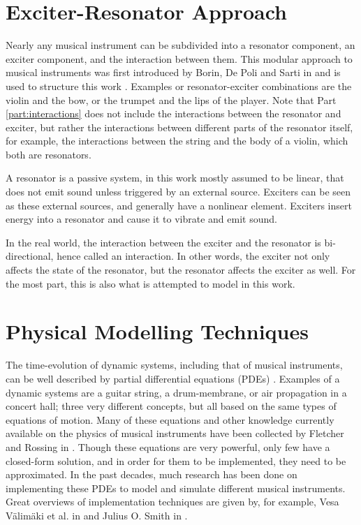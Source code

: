 \section{Exciter-Resonator Approach}
Nearly any musical instrument can be subdivided into a resonator component, an exciter component, and the interaction between them. This modular approach to musical instruments was first introduced by Borin, De Poli and Sarti in \cite{Borin1989} and is used to structure this work . Examples or resonator-exciter combinations are the violin and the bow, or the trumpet and the lips of the player. Note that Part \ref{part:interactions} does not include the interactions between the resonator and exciter, but rather the interactions between different parts of the resonator itself, for example, the interactions between the string and the body of a violin, which both are resonators.  

A resonator is a passive system, in this work mostly assumed to be linear, that does not emit sound unless triggered by an external source. Exciters can be seen as these external sources, and generally have a nonlinear element. Exciters insert energy into a resonator and cause it to vibrate and emit sound.

In the real world, the interaction between the exciter and the resonator is bi-directional, hence called an interaction. In other words, the exciter not only affects the state of the resonator, but the resonator affects the exciter as well. For the most part, this is also what is attempted to model in this work.


\section{Physical Modelling Techniques}\label{sec:physModTech}
The time-evolution of dynamic systems, including that of musical instruments, can be well described by partial differential equations (PDEs) \cite{Fletcher1998, theBible}. Examples of a dynamic systems are a guitar string, a drum-membrane, or air propagation in a concert hall; three very different concepts, but all based on the same types of equations of motion. Many of these equations and other knowledge currently available on the physics of musical instruments have been collected by Fletcher and Rossing in \cite{Fletcher1998}. Though these equations are very powerful, only few have a closed-form solution, and in order for them to be implemented, they need to be approximated. In the past decades, much research has been done on implementing these PDEs to model and simulate different musical instruments. Great overviews of implementation techniques are given by, for example, Vesa V{\"a}lim{\"a}ki et al. in \cite{Valimaki2006} and Julius O. Smith in \cite{Smith2010a, Smith2010b}. 
\\

